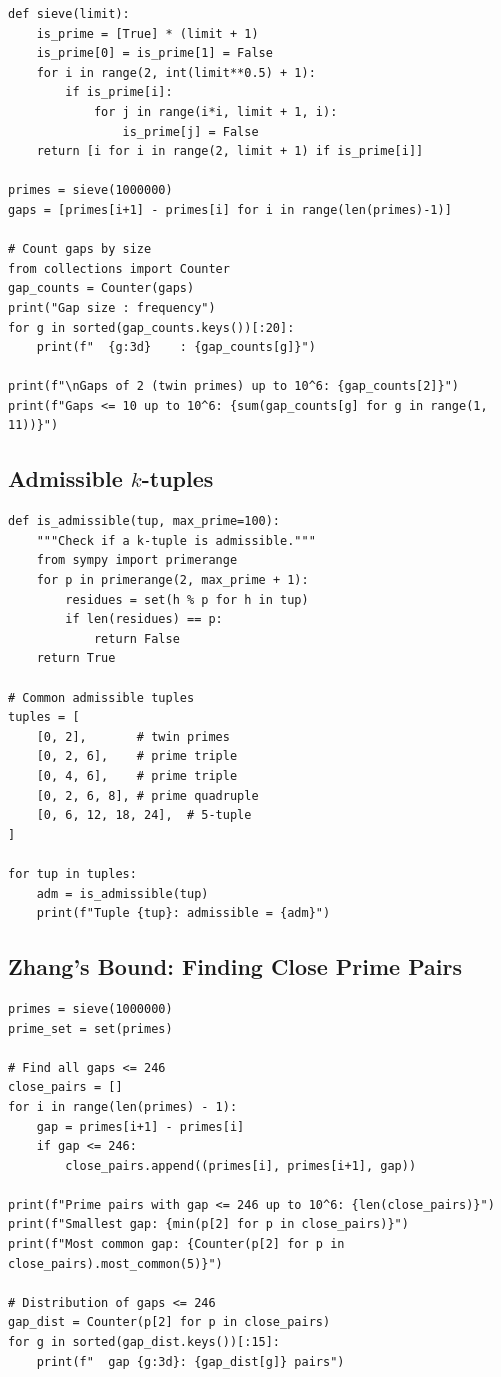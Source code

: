 \begin{verbatim}
def sieve(limit):
    is_prime = [True] * (limit + 1)
    is_prime[0] = is_prime[1] = False
    for i in range(2, int(limit**0.5) + 1):
        if is_prime[i]:
            for j in range(i*i, limit + 1, i):
                is_prime[j] = False
    return [i for i in range(2, limit + 1) if is_prime[i]]

primes = sieve(1000000)
gaps = [primes[i+1] - primes[i] for i in range(len(primes)-1)]

# Count gaps by size
from collections import Counter
gap_counts = Counter(gaps)
print("Gap size : frequency")
for g in sorted(gap_counts.keys())[:20]:
    print(f"  {g:3d}    : {gap_counts[g]}")

print(f"\nGaps of 2 (twin primes) up to 10^6: {gap_counts[2]}")
print(f"Gaps <= 10 up to 10^6: {sum(gap_counts[g] for g in range(1, 11))}")
\end{verbatim}

\subsection{Admissible $k$-tuples}

\begin{verbatim}
def is_admissible(tup, max_prime=100):
    """Check if a k-tuple is admissible."""
    from sympy import primerange
    for p in primerange(2, max_prime + 1):
        residues = set(h % p for h in tup)
        if len(residues) == p:
            return False
    return True

# Common admissible tuples
tuples = [
    [0, 2],       # twin primes
    [0, 2, 6],    # prime triple
    [0, 4, 6],    # prime triple
    [0, 2, 6, 8], # prime quadruple
    [0, 6, 12, 18, 24],  # 5-tuple
]

for tup in tuples:
    adm = is_admissible(tup)
    print(f"Tuple {tup}: admissible = {adm}")
\end{verbatim}

\subsection{Zhang's Bound: Finding Close Prime Pairs}

\begin{verbatim}
primes = sieve(1000000)
prime_set = set(primes)

# Find all gaps <= 246
close_pairs = []
for i in range(len(primes) - 1):
    gap = primes[i+1] - primes[i]
    if gap <= 246:
        close_pairs.append((primes[i], primes[i+1], gap))

print(f"Prime pairs with gap <= 246 up to 10^6: {len(close_pairs)}")
print(f"Smallest gap: {min(p[2] for p in close_pairs)}")
print(f"Most common gap: {Counter(p[2] for p in close_pairs).most_common(5)}")

# Distribution of gaps <= 246
gap_dist = Counter(p[2] for p in close_pairs)
for g in sorted(gap_dist.keys())[:15]:
    print(f"  gap {g:3d}: {gap_dist[g]} pairs")
\end{verbatim}


